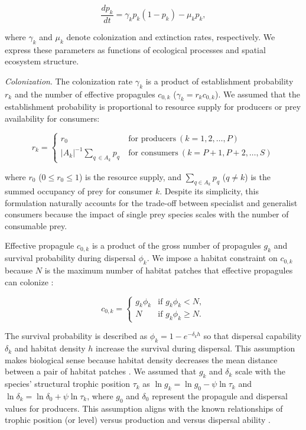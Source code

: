 \documentclass[11pt, class=article, crop=false]{standalone}
\begin{document}
\begin{equation}
    \frac{dp_k}{dt} = \gamma_{k} p_k (1 - p_k) - \mu_k p_k,
\end{equation}

where $\gamma_k$ and $\mu_k$ denote colonization and extinction rates, respectively.
We express these parameters as functions of ecological processes and spatial ecosystem structure.

\textit{Colonization}. The colonization rate $\gamma_k$ is a product of establishment probability $r_k$ and the number of effective propagules $c_{0,k}$ ($\gamma_k = r_k c_{0,k}$).
We assumed that the establishment probability is proportional to resource supply for producers or prey availability for consumers:

\begin{equation}
    r_{k} = 
    \begin{cases}
        r_0 & ~\text{for producers}~ (k=1, 2, \ldots, P)\\
        |A_{k}|^{-1} \sum_{q~\in A_{k}} p_{q} & ~\text{for consumers}~ (k=P+1, P+2, \ldots, S)
    \end{cases}
\end{equation}

where $r_0$ ($0 \le r_0 \le 1$) is the resource supply, and $\sum_{q \in A_{k}} p_{q}$ ($q \ne k$) is the summed occupancy of prey for consumer $k$.
Despite its simplicity, this formulation naturally accounts for the trade-off between specialist and generalist consumers because the impact of single prey species scales with the number of consumable prey.

Effective propagule $c_{0,k}$ is a product of the gross number of propagules $g_k$ and survival probability during dispersal $\phi_k$.
We impose a habitat constraint on $c_{0,k}$ because $N$ is the maximum number of habitat patches that effective propagules can colonize \citep{takimoto_effects_2012, terui_spatial_2019}:

\begin{equation}
    c_{0, k} = 
    \begin{cases}
        g_k \phi_k & \text{if $g_k \phi_k < N$},\\
        N & \text{if $g_k \phi_k \ge N$}.
    \end{cases}
    \label{eq:c0-prod}
\end{equation}

The survival probability is described as $\phi_k = 1 - e^{-\delta_k h}$ so that dispersal capability $\delta_k$ and habitat density $h$ increase the survival during dispersal.
This assumption makes biological sense because habitat density decreases the mean distance between a pair of habitat patches \citep{terui_spatial_2019}.
We assumed that $g_k$ and $\delta_k$ scale with the species' structural trophic position $\tau_k$ as $\ln g_k = \ln g_0 - \psi \ln \tau_k$ and $\ln \delta_k = \ln \delta_0 + \psi \ln \tau_k$, where $g_0$ and $\delta_0$ represent the propagule and dispersal values for producers.
This assumption aligns with the known relationships of trophic position (or level) versus production \citep{finlay_stream_2011} and versus dispersal ability \citep{mccann_dynamics_2005}.
\end{document}
